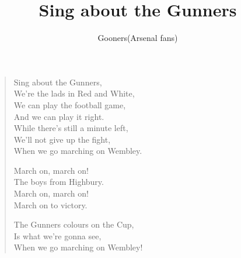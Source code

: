 \documentclass[a4paper,12pt]{article}
\title{Sing about the Gunners}
\author{Gooners(Arsenal fans)}
\date{}
\begin{document}
	
	\maketitle
	
	\begin{verse}
		
		Sing about the Gunners, \\
		We're the lads in Red and White, \\
		We can play the football game, \\
		And we can play it right. \\
		While there's still a minute left, \\
		We'll not give up the fight, \\
		When we go marching on Wembley.\par 
		March on, march on! \\
		The boys from Highbury. \\
		March on, march on! \\
		March on to victory.\par
		The Gunners colours on the Cup, \\
		Is what we're gonna see, \\
		When we go marching on Wembley!
		
	\end{verse}
	
\end{document}
